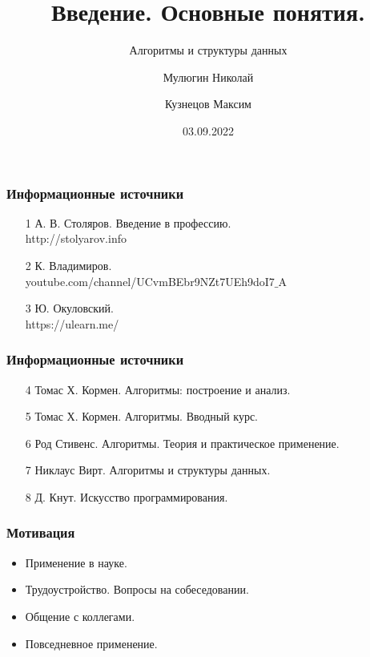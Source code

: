 \documentclass[russian, 12pt]{beamer}
\title{Введение. Основные понятия.}
\subtitle{Алгоритмы и структуры данных}
\author{
  Мулюгин Николай
  \and
  Кузнецов Максим \texorpdfstring{\thinspace}{Lg}
  }
\date{03.09.2022}
\begin{document}
\begin{frame}
\titlepage
\end{frame}
\begin{frame}
\frametitle{Информационные источники}
  \begin{itemize}
    \item [1] А. В. Столяров. Введение в профессию.\\
      http://stolyarov.info\\[0.5cm]

    \item [2] К. Владимиров.\\
    youtube.com/channel/UCvmBEbr9NZt7UEh9doI7$\_$A\\[0.5cm]

    \item [3] Ю. Окуловский.\\ 
    https://ulearn.me/

  \end{itemize}
\end{frame}
\begin{frame}
\frametitle{Информационные источники}
  \begin{itemize}
    \item [4] Томас Х. Кормен. Алгоритмы: построение и анализ.\\[0.5cm]

    \item [5] Томас Х. Кормен. Алгоритмы. Вводный курс.\\[0.5cm]

    \item [6] Род Стивенс. Алгоритмы. Теория и практическое применение.\\[0.5cm]
    
    \item [7] Никлаус Вирт. Алгоритмы и структуры данных.\\[0.5cm]
    
    \item [8] Д. Кнут. Искусство программирования.

  \end{itemize}
\end{frame}
\begin{frame}
\frametitle{Мотивация}
  \begin{itemize}
    \item Применение в науке.\\[0.5cm]

    \item Трудоустройство. Вопросы на собеседовании.\\[0.5cm]

    \item Общение с коллегами.\\[0.5cm]
    
    \item Повседневное применение.\\[0.5cm]

  \end{itemize}
\end{frame}
\end{document}
